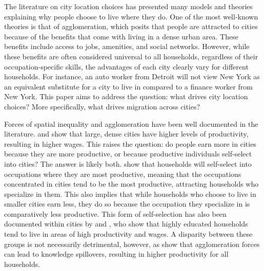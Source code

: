 \documentclass[10pt]{article}
\begin{document}
The literature on city location choices has presented many models and theories explaining why people choose to live where they do. One of the most well-known theories is that of agglomeration, which posits that people are attracted to cities because of the benefits that come with living in a dense urban area. These benefits include access to jobs, amenities, and social networks. However, while these benefits are often considered universal to all households, regardless of their occupation-specific skills, the advantages of each city clearly vary for different households. For instance, an auto worker from Detroit will not view New York as an equivalent substitute for a city to live in compared to a finance worker from New York. This paper aims to address the question: what drives city location choices? More specifically, what drives migration across cities?

Forces of spatial inequality and agglomeration have been well documented in the literature. \cite{behrens2014} and \cite{br2015} show that large, dense cities have higher levels of productivity, resulting in higher wages. This raises the question: do people earn more in cities because they are more productive, or because productive individuals self-select into cities? The answer is likely both. \cite{lagakos_waugh2013} show that households will self-select into occupations where they are most productive, meaning that the occupations concentrated in cities tend to be the most productive, attracting households who specialize in them. This also implies that while households who choose to live in smaller cities earn less, they do so because the occupation they specialize in is comparatively less productive. This form of self-selection has also been documented within cities by \cite{diamond} and \cite{diamond2022}, who show that highly educated households tend to live in areas of high productivity and wages. A disparity between these groups is not necessarily detrimental, however, as \cite{dandd} show that agglomeration forces can lead to knowledge spillovers, resulting in higher productivity for all households.
\end{document}
